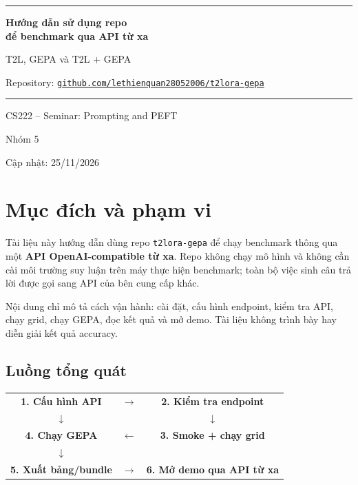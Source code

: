 \documentclass[11pt,a4paper]{article}
\newcommand{\Repo}{\texttt{t2lora-gepa}}
\begin{document}
\begin{titlepage}
  \centering
  \vspace*{2.2cm}
  {\color{accent}\rule{\linewidth}{1.2pt}}\par\vspace{1.0cm}
  {\Huge\bfseries Hướng dẫn sử dụng repo\\[0.25em] để benchmark qua API từ xa\par}
  \vspace{0.9cm}
  {\Large T2L, GEPA và T2L + GEPA\par}
  \vspace{0.9cm}
  {\large Repository: \href{https://github.com/lethienquan28052006/t2lora-gepa}{%
    \texttt{github.com/lethienquan28052006/t2lora-gepa}}\par}
  \vspace{0.9cm}
  {\color{accent}\rule{\linewidth}{0.6pt}}\par
  \vfill
  {\large CS222 -- Seminar: Prompting and PEFT\par}
  {\large Nhóm 5\par}
  \vspace{0.8cm}
  {\large Cập nhật: 25/11/2026\par}
\end{titlepage}

\tableofcontents
\newpage

\section{Mục đích và phạm vi}

Tài liệu này hướng dẫn dùng repo \Repo{} để chạy benchmark thông qua một \textbf{API OpenAI-compatible từ xa}. Repo không chạy mô hình và không cần cài môi trường suy luận trên máy thực hiện benchmark; toàn bộ việc sinh câu trả lời được gọi sang API của bên cung cấp khác.

Nội dung chỉ mô tả cách vận hành: cài đặt, cấu hình endpoint, kiểm tra API, chạy grid, chạy GEPA, đọc kết quả và mở demo. Tài liệu không trình bày hay diễn giải kết quả accuracy.

\subsection{Luồng tổng quát}

\begin{center}
\small
\begin{tabular}{@{}c c c@{}}
\textbf{1. Cấu hình API} & $\rightarrow$ & \textbf{2. Kiểm tra endpoint} \\
$\downarrow$ & & $\downarrow$ \\
\textbf{4. Chạy GEPA} & $\leftarrow$ & \textbf{3. Smoke + chạy grid} \\
$\downarrow$ & & \\
\textbf{5. Xuất bảng/bundle} & $\rightarrow$ & \textbf{6. Mở demo qua API từ xa}
\end{tabular}
\end{center}
\end{document}

